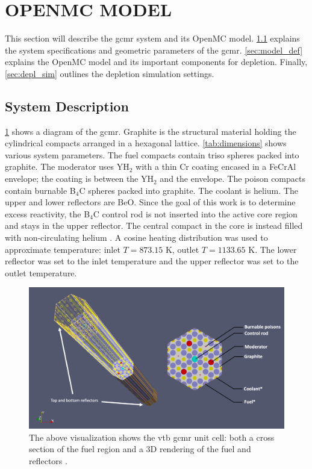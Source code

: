 \documentclass[letterpaper]{physor2024}
\begin{document}
\section{OPENMC MODEL}\label{sec:openmc_model}
This section will describe the \gls{gcmr} system and its OpenMC model. \cref{sec:system} explains the system specifications and geometric parameters of the \gls{gcmr}. \cref{sec:model_def} explains the OpenMC model and its important components for depletion. Finally, \cref{sec:depl_sim} outlines the depletion simulation settings.

\subsection{System Description}\label{sec:system}
\cref{fig:vtb_gcmr} shows a diagram of the \gls{gcmr}. Graphite is the structural material holding the cylindrical compacts arranged in a hexagonal lattice. \cref{tab:dimensions} shows various system parameters. The fuel compacts contain \gls{triso} spheres packed into graphite. The moderator uses YH$_{2}$ with a thin Cr coating encased in a FeCrAl envelope; the coating is between the YH$_{2}$ and the envelope. The poison compacts contain burnable B$_{4}$C spheres packed into graphite. The coolant is helium. The upper and lower reflectors are BeO. Since the goal of this work is to determine excess reactivity, the B$_{4}$C control rod is not inserted into the active core region and stays in the upper reflector. The central compact in the core is instead filled with non-circulating helium \cite{Abdelhameed-ANS-2022}. A cosine heating distribution was used to approximate temperature: inlet $T=873.15$ K, outlet $T=1133.65$ K. The lower reflector was set to the inlet temperature and the upper reflector was set to the outlet temperature.
\vspace*{-0.2cm}
 \begin{figure}[h]
    \centering
    \includegraphics[width=0.625\linewidth]{figures/vtb_gcmr_diagram.jpg}
    \caption{The above visualization shows the \gls{vtb} \gls{gcmr} unit cell: both a cross section of the fuel region and a 3D rendering of the fuel and reflectors \cite{Stauff-applications-2022}.}
    \label{fig:vtb_gcmr}
\end{figure}
\end{document}
